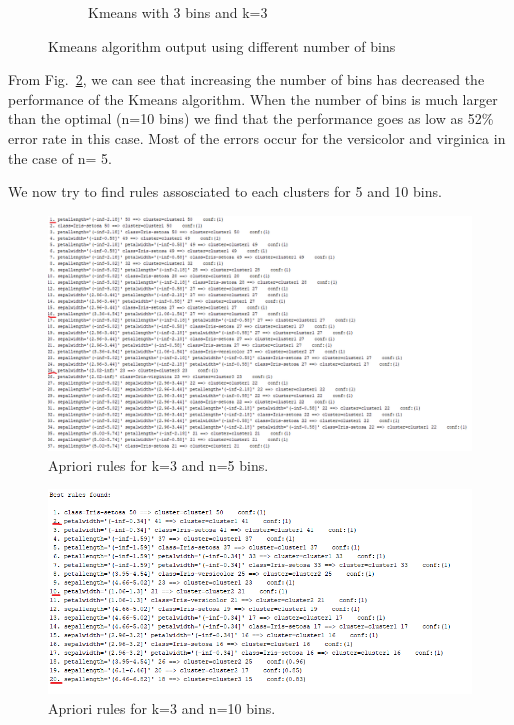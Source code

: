 \documentclass[letterpaper,12pt]{article}
\begin{document}
\begin{figure}[H]
\begin{subfigure}{.5\textwidth}
  \caption{Kmeans with 3 bins and k=3}
  \label{fig:sub-third_2}
\end{subfigure}
\caption{Kmeans algorithm output using different number of bins}
\label{fig:fig_2}
\end{figure}

From Fig.~\ref{fig:fig_2}, we can see that increasing the number of bins has decreased the performance of the Kmeans algorithm. When the number of bins is much larger than the optimal (n=10 bins) we find that the performance goes as low as 52\% error rate in this case. Most of the errors occur for the versicolor and virginica in the case of n= 5.

We now try to find rules assosciated to each clusters for 5 and 10 bins.

\begin{figure}[H] 
  \centering
      \includegraphics[width=0.8\columnwidth]{5_bins_3cl_apriori_rules}
        \caption{
                \label{fig:5bins_3cl_apriori}  
                Apriori rules for k=3 and n=5 bins.
        }
\end{figure}


\begin{figure}[H] 
  \centering
      \includegraphics[width=0.8\columnwidth]{10_bins_3cl_apriori_rules}
        \caption{
                \label{fig:10bins_3cl_apriori}  
                Apriori rules for k=3 and n=10 bins.
        }
\end{figure}
\end{document}
